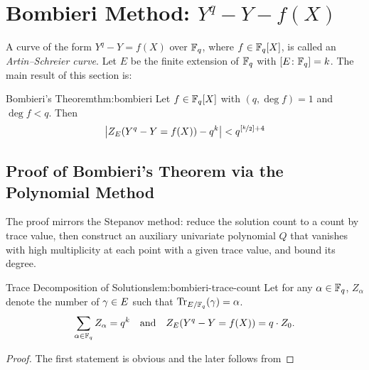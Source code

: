 \section{Bombieri Method: \texorpdfstring{$Y^q-Y-f(X)$}{ Yq - Y - f(X)}}\label{sec:bombieri}
A curve of the form $Y^q-Y=f(X)$ over $\mathbb{F}_q$, where $f\in\mathbb{F}_q[X]$, is called an \emph{Artin--Schreier curve}. Let $E$ be the finite extension of $\mathbb{F}_q$ with $[E\colon \mathbb{F}_q]=k$. The main result of this section is:
\begin{Theorem}{Bombieri's Theorem}{thm:bombieri}
  Let $f\in\mathbb{F}_q[X]$ with $(q,\deg f)=1$ and $\deg f<q$. Then $$\left|Z_E(Y^q-Y=f(X))-q^k\right|<q^{\left[\nicefrac{k}2\right]+4}$$
\end{Theorem}


\subsection{Proof of Bombieri's Theorem via the Polynomial Method}

The proof mirrors the Stepanov method: reduce the solution count to a count by trace value, then construct an auxiliary univariate polynomial $Q$ that vanishes with high multiplicity at each point with a given trace value, and bound its degree.

\begin{lemma}{Trace Decomposition of Solutions}{lem:bombieri-trace-count}
  Let for any $\alpha\in\mathbb{F}_q$, $Z_{\alpha}$ denote the number of $\gamma\in E$ such that $\operatorname{Tr}_{E/\mathbb{F}_q}(\gamma)=\alpha$.
  $$\sum_{\alpha\in\mathbb{F}_q}Z_{\alpha}=q^k\quad\text{and}\quad Z_E(Y^q-Y=f(X))=q\cdot Z_0.$$
\end{lemma}
\begin{proof}
  The first statement is obvious and the later follows from \TraceZeroArtinSchreierthm
\end{proof}

